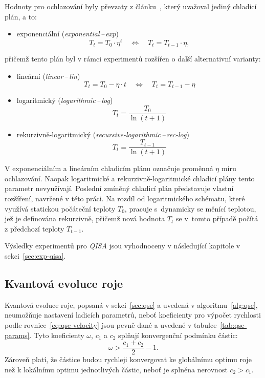 Hodnoty pro ochlazování byly převzaty z článku~\cite{qisa}, který uvažoval jediný chladicí plán, a to:
\begin{itemize}
    \item exponenciální (\emph{exponential\,--\,exp})~\cite{qisa,sa-cooling}
    \begin{equation}\label{eq:qisa-exp}
        T_t = T_0 \cdot \eta^t \quad\Longleftrightarrow\quad T_t = T_{t-1} \cdot \eta,
    \end{equation}
\end{itemize}
přičemž tento plán byl v rámci experimentů rozšířen o další alternativní varianty:
\begin{itemize}
    \item lineární (\emph{linear\,--\,lin})~\cite{sa-cooling}
    \begin{equation}\label{eq:qisa-lin}
        T_t = T_0 - \eta \cdot t \quad\Longleftrightarrow\quad T_t = T_{t-1} - \eta
    \end{equation}
    \item logaritmický (\emph{logarithmic\,--\,log})~\cite{metaheuristics,sa-cooling, banchs_simulated_annealing}
    \begin{equation}\label{eq:qisa-log}
        T_t = \frac{T_0}{\ln\left(t+1\right)}
    \end{equation}
    \item rekurzivně-logaritmický (\emph{recursive-logarithmic\,--\,rec-log})
    \begin{equation}\label{eq:qisa-rec-log}
        T_t = \frac{T_{t-1}}{\ln\left(t+1\right)}
    \end{equation}
\end{itemize}
V exponenciálním a lineárním chladicím plánu označuje proměnná $\eta$ míru ochlazování. 
Naopak logaritmické a rekurzivně-logaritmické chladicí plány tento parametr nevyužívají. 
Poslední zmíněný chladicí plán představuje vlastní rozšíření, navržené v této práci. 
Na rozdíl od logaritmického schématu, které využívá statickou počáteční teploty $T_0$, pracuje s~dynamicky se měnící teplotou, jež je definována rekurzivně, přičemž nová hodnota $T_t$ se v~tomto případě počítá z předchozí teploty $T_{t-1}$.

Výsledky experimentů pro \emph{QISA} jsou vyhodnoceny v následující kapitole v sekci~\ref{sec:exp-qisa}.

\subsection*{Kvantová evoluce roje}
Kvantová evoluce roje, popsaná v sekci~\ref{sec:qse} a uvedená v algoritmu~\ref{alg:qse}, neumožňuje nastavení ladicích parametrů, neboť koeficienty pro výpočet rychlosti podle rovnice~\ref{eq:qse-velocity} jsou pevně dané a uvedené v tabulce~\ref{tab:qse-params}.
Tyto koeficienty $\omega$, $c_1$ a $c_2$ splňují konvergenční podmínku částic:
\begin{equation*}
    \omega > \frac{c_1 + c_2}{2} - 1.
\end{equation*}
Zároveň platí, že částice budou rychleji konvergovat ke globálnímu optimu roje než k lokálnímu optimu jednotlivých částic, neboť je splněna nerovnost $c_2 > c_1$. 

